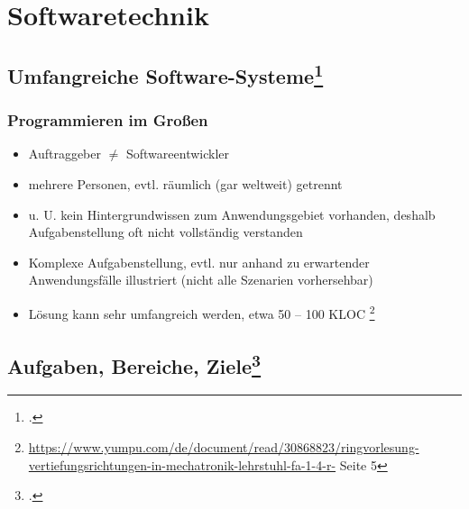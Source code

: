 \documentclass{lehramt-informatik-haupt}
\begin{document}

\chapter{Softwaretechnik}

%

\section{Umfangreiche Software-Systeme\footcite[Seite 6]{sosy:fs:1}}

\subsection{Programmieren im Großen}

\begin{itemize}
\item Auftraggeber $\neq$ Softwareentwickler

\item mehrere Personen, evtl. räumlich (gar weltweit) getrennt

\item u. U. kein Hintergrundwissen zum Anwendungsgebiet vorhanden,
deshalb Aufgabenstellung oft nicht vollständig verstanden

\item Komplexe Aufgabenstellung, evtl. nur anhand zu erwartender
Anwendungsfälle illustriert (nicht alle Szenarien vorhersehbar)

\item Lösung kann sehr umfangreich werden, etwa 50 – 100 KLOC
\footnote{\url{https://www.yumpu.com/de/document/read/30868823/ringvorlesung-vertiefungsrichtungen-in-mechatronik-lehrstuhl-fa-1-4-r-} Seite 5}
\end{itemize}

%

\section{Aufgaben, Bereiche, Ziele\footcite[Seite 8]{sosy:fs:1}}
\end{document}
